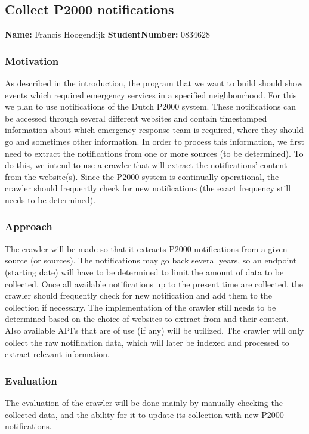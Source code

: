 \subsection{Collect P2000 notifications}
\textbf{Name:} Francis Hoogendijk \indent \textbf{StudentNumber:} 0834628

\subsubsection*{Motivation}
As described in the introduction, the program that we want to build should show events which required emergency services in a specified neighbourhood. For this we plan to use notifications of the Dutch P2000 system. These notifications can be accessed through several different websites and contain timestamped information about which emergency response team is required, where they should go and sometimes other information. In order to process this information, we first need to extract the notifications from one or more sources (to be determined). To do this, we intend to use a crawler that will extract the notifications' content from the website(s). Since the P2000 system is continually operational, the crawler should frequently check for new notifications (the exact frequency still needs to be determined). 

\subsubsection*{Approach}
The crawler will be made so that it extracts P2000 notifications from a given source (or sources). The notifications may go back several years, so an endpoint (starting date) will have to be determined to limit the amount of data to be collected. Once all available notifications up to the present time are collected, the crawler should frequently check for new notification and add them to the collection if necessary. The implementation of the crawler still needs to be determined based on the choice of websites to extract from and their content. Also available API's that are of use (if any) will be utilized. The crawler will only collect the raw notification data, which will later be indexed and processed to extract relevant information. 

\subsubsection*{Evaluation}
The evaluation of the crawler will be done mainly by manually checking the collected data, and the ability for it to update its collection with new P2000 notifications.